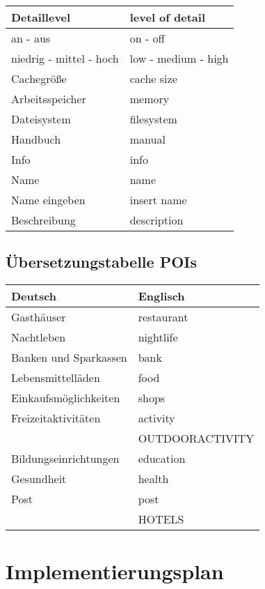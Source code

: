 \documentclass[10pt]{scrreprt}
\begin{document}
\begin{longtable}{|p{7.5cm}|p{7.5cm}|}
\hline
Detaillevel & level of detail \\
\hline
an - aus & on - off \\
\hline
niedrig - mittel - hoch & low - medium - high\\
\hline
Cachegröße & cache size \\
\hline
Arbeitsspeicher & memory \\
\hline
Dateisystem & filesystem \\
\hline
Handbuch & manual \\
\hline
Info & info \\
\hline
Name & name \\
\hline
Name eingeben & insert name \\
\hline
Beschreibung & description \\
\hline
\end{longtable}

\newpage
\section{Übersetzungstabelle POIs}
\begin{longtable}{|p{7.5cm}|p{7.5cm}|}
\hline 
\textbf{Deutsch} & \textbf{Englisch} \\ 
\hline
\hline 
Gasthäuser & restaurant \\ 
\hline
Nachtleben & nightlife \\ 
\hline
Banken und Sparkassen & bank \\ 
\hline
Lebensmittelläden & food \\ 
\hline
Einkaufsmöglichkeiten & shops \\ 
\hline
Freizeitaktivitäten & activity \\ 
\hline
& OUTDOORACTIVITY \\
\hline
Bildungseinrichtungen & education \\
\hline
Gesundheit & health \\
\hline
Post & post \\ 
\hline
& HOTELS \\
\hline
\end{longtable}





\chapter{Implementierungsplan}
\end{document}
